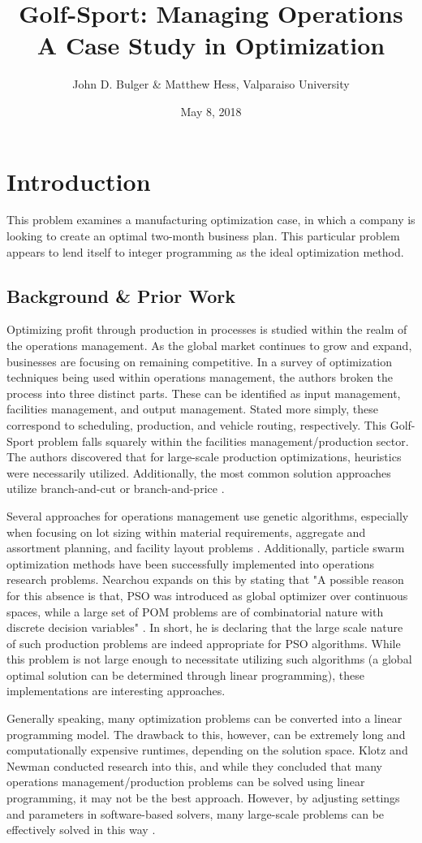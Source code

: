 \documentclass{article}
\title{Golf-Sport:  Managing Operations \\ A Case Study in Optimization}
\date{May 8, 2018}
\author{John D. Bulger \& Matthew Hess, Valparaiso University}
\begin{document}
	\maketitle
	\newpage
\section{Introduction}
This problem examines a manufacturing optimization case, in which a company is looking to create an optimal two-month business plan.  This particular problem appears to lend itself to integer programming as the ideal optimization method.
\subsection{Background \& Prior Work}
Optimizing profit through production in processes is studied within the realm of the operations management.  As the global market continues to grow and expand, businesses are focusing on remaining competitive.  In a survey of 
optimization techniques being used within operations management, the authors broken the process into three distinct parts.  These can be identified as input management, facilities management, and output management.  Stated more simply, these correspond to 
scheduling, production, and vehicle routing, respectively.  This Golf-Sport problem falls squarely within the facilities management/production sector.  The authors discovered that for large-scale production optimizations, heuristics were necessarily utilized.  
Additionally, the most common solution approaches utilize branch-and-cut or branch-and-price \cite{survey}.
\par
Several approaches for operations management use genetic algorithms, especially when focusing on lot sizing within material requirements, aggregate and assortment planning, and facility layout problems \cite{gen}.  
Additionally, particle swarm optimization methods have been successfully implemented into operations research problems.  Nearchou expands on this by stating that "A possible reason for this absence is that, PSO was introduced as global optimizer over continuous spaces, while a large set of POM problems are of combinatorial nature with discrete decision variables" \cite{and}.  In short, he is declaring that the large scale nature of such production problems are indeed appropriate for PSO algorithms.  
While this problem is not large enough to necessitate utilizing such algorithms (a global optimal solution can be determined through linear programming), these implementations are interesting approaches.
\par
Generally speaking, many optimization problems can be converted into a linear programming model.  The drawback to this, however, can be extremely long and computationally expensive runtimes, depending on the solution space.  Klotz and Newman conducted research into this, and 
while they concluded that many operations management/production problems can be solved using linear programming, it may not be the best approach.  However, by adjusting settings and parameters in software-based solvers, many large-scale problems can be effectively solved in this way \cite{klotz}. 
\end{document}
